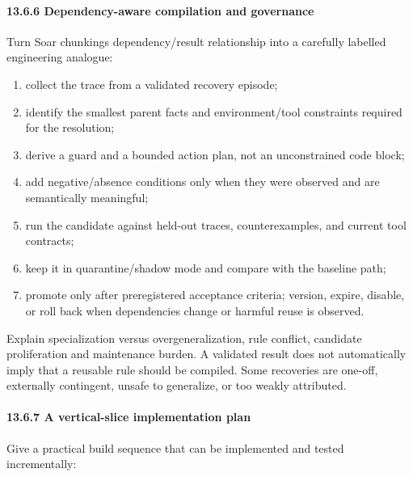 \paragraph{13.6.6 Dependency-aware compilation and governance}\label{1366-dependency-aware-compilation-and-governance}

Turn Soar chunking\textquotesingle s dependency/result relationship into a carefully labelled engineering analogue:

\begin{enumerate}
\def\labelenumi{\arabic{enumi}.}
\tightlist
\item
  collect the trace from a validated recovery episode;
\item
  identify the smallest parent facts and environment/tool constraints required for the resolution;
\item
  derive a guard and a bounded action plan, not an unconstrained code block;
\item
  add negative/absence conditions only when they were observed and are semantically meaningful;
\item
  run the candidate against held-out traces, counterexamples, and current tool contracts;
\item
  keep it in quarantine/shadow mode and compare with the baseline path;
\item
  promote only after preregistered acceptance criteria; version, expire, disable, or roll back when dependencies change or harmful reuse is observed.
\end{enumerate}

Explain specialization versus overgeneralization, rule conflict, candidate proliferation and maintenance burden. A validated result does not automatically imply that a reusable rule should be compiled. Some recoveries are one-off, externally contingent, unsafe to generalize, or too weakly attributed.

\paragraph{13.6.7 A vertical-slice implementation plan}\label{1367-a-vertical-slice-implementation-plan}

Give a practical build sequence that can be implemented and tested incrementally:

